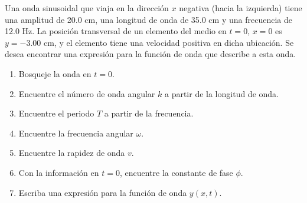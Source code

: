 \item Una onda sinusoidal que viaja en la dirección $x$ negativa (hacia la izquierda) tiene una amplitud de 20.0 cm, una longitud de onda de 35.0 cm y una frecuencia de 12.0 Hz. La posición transversal de un elemento del medio en $t = 0$, $x = 0$ es $y = -3.00\text{ cm}$, y el elemento tiene una velocidad positiva en dicha ubicación. Se desea encontrar una expresión para la función de onda que describe a esta onda.
\begin{enumerate}
    \item Bosqueje la onda en $t = 0$.
    \item Encuentre el número de onda angular $k$ a partir de la longitud de onda.
    \item Encuentre el periodo $T$ a partir de la frecuencia.
    \item Encuentre la frecuencia angular $\omega$.
    \item Encuentre la rapidez de onda $v$.
    \item Con la información en $t = 0$, encuentre la constante de fase $\phi$.
    \item Escriba una expresión para la función de onda $y(x,t)$.
\end{enumerate}